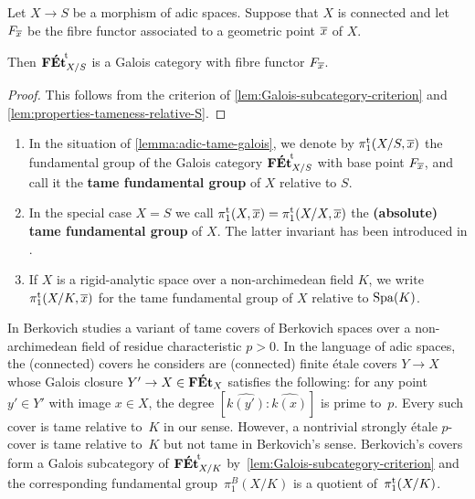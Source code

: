 \begin{lem} 
\label{lemma:adic-tame-galois}
    Let $X\to S$ be a morphism of adic spaces. Suppose that $X$ is connected and let $F_{\overline{x}}$ be the fibre functor associated to a geometric point  $\overline{x}$ of $X$. 

    Then ${\mathbf{F\acute{E}t}}^{\!\mathrm{t}}_{X/S}$ is a Galois category with fibre functor $F_{\overline{x}}$. 
\end{lem}

\begin{proof}
This follows from the criterion of \cref{lem:Galois-subcategory-criterion} and \cref{lem:properties-tameness-relative-S}. 
\end{proof}

\begin{defi} \label{def:tamepi1-rigid}
\begin{enumerate}
    \item 
    In the situation of \cref{lemma:adic-tame-galois}, we denote by 
    $\pi_1^{\mathrm{t}}(X/S, \overline{x})$
    the fundamental group of the Galois category ${\mathbf{F\acute{E}t}}^{\!\mathrm{t}}_{X/S}$ with base point $F_{\overline{x}}$, and call it the \textbf{tame fundamental group} of $X$ relative to $S$. 
    \item
    In the special case $X = S$ we call $\pi_1^{\mathrm{t}}(X, \overline{x}) = \pi_1^{\mathrm{t}}(X/X, \overline{x})$ the \textbf{(absolute) tame fundamental group} of $X$. The latter invariant has been introduced in \cite[\S9]{Hubner2021:AdicTameSite}.
    \item    
    If $X$ is a rigid-analytic space over a non-archimedean field $K$, we write $\pi_1^{\mathrm{t}}(X/K, \overline{x})$ for the tame fundamental group of $X$ relative to $\operatorname{Spa}(K)$. 
\end{enumerate}
\end{defi}

\begin{rmk} \label{rmk:Berkovich-covers}
    In \cite[\S6.3]{Berkovich:EtaleCohomology} Berkovich studies a variant of tame covers of Berkovich spaces over a non-archimedean field of residue characteristic $p > 0$.
    In the language of adic spaces, the (connected) covers he considers are (connected) finite étale covers $Y \to X$ whose Galois closure $Y' \to X \in \mathbf{F\acute{E}t}_X$ satisfies the following: for any point $y' \in Y'$ with image $x \in X$, the degree $[\widehat{k(y')}:\widehat{k(x)}]$ is prime to~$p$.
    Every such cover is tame relative to~$K$ in our sense.
    However, a nontrivial strongly étale $p$-cover is tame relative to~$K$ but not tame in Berkovich's sense.
    Berkovich's covers form a Galois subcategory of ${\mathbf{F\acute{E}t}}^{\!\mathrm{t}}_{X/K}$ by~\cref{lem:Galois-subcategory-criterion} and the corresponding fundamental group~$\pi_1^B(X/K)$ is a quotient of~$\pi_1^{\mathrm{t}}(X/K)$.
\end{rmk}

